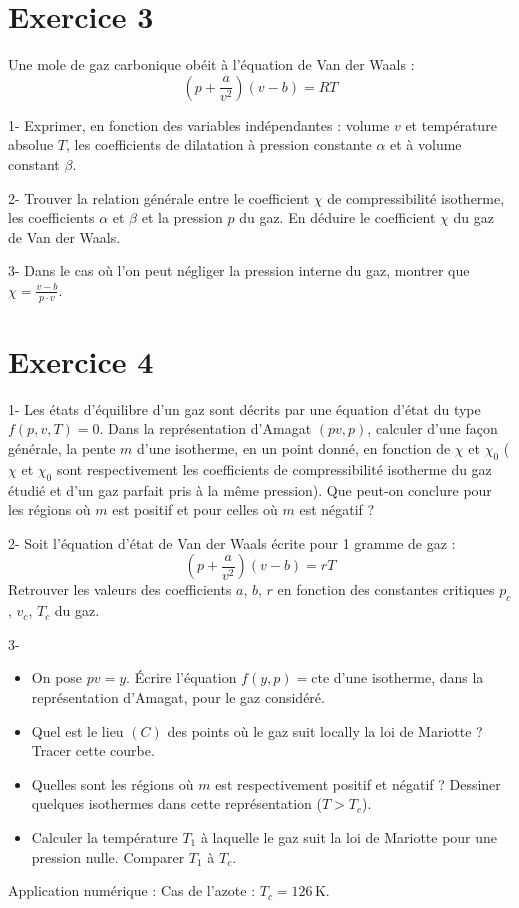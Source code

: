 \documentclass[a4paper,12pt]{article}
\begin{document}
	\section*{Exercice 3}
	Une mole de gaz carbonique obéit à l'équation de Van der Waals :
	\begin{equation}
		\left(p + \frac{a}{v^2}\right)(v-b) = RT
	\end{equation}
	
	1- Exprimer, en fonction des variables indépendantes : volume $v$ et température absolue $T$, les coefficients de dilatation à pression constante $\alpha$ et à volume constant $\beta$.
	
	2- Trouver la relation générale entre le coefficient $\chi$ de compressibilité isotherme, les coefficients $\alpha$ et $\beta$ et la pression $p$ du gaz. En déduire le coefficient $\chi$ du gaz de Van der Waals.
	
	3- Dans le cas où l'on peut négliger la pression interne du gaz, montrer que $\chi = \frac{v-b}{p \cdot v}$.
	
	\section*{Exercice 4}
	1- Les états d'équilibre d'un gaz sont décrits par une équation d'état du type $f(p,v,T) = 0$. Dans la représentation d'Amagat $(pv, p)$, calculer d'une façon générale, la pente $m$ d'une isotherme, en un point donné, en fonction de $\chi$ et $\chi_0$ ($\chi$ et $\chi_0$ sont respectivement les coefficients de compressibilité isotherme du gaz étudié et d'un gaz parfait pris à la même pression). Que peut-on conclure pour les régions où $m$ est positif et pour celles où $m$ est négatif ?
	
	2- Soit l'équation d'état de Van der Waals écrite pour 1 gramme de gaz :
	\begin{equation}
		\left(p + \frac{a}{v^2}\right)(v-b) = rT
	\end{equation}
	Retrouver les valeurs des coefficients $a$, $b$, $r$ en fonction des constantes critiques $p_c$, $v_c$, $T_c$ du gaz.
	
	3- 
	\begin{itemize}
		\item[a)] On pose $pv = y$. Écrire l'équation $f(y,p) = \text{cte}$ d'une isotherme, dans la représentation d'Amagat, pour le gaz considéré.
		\item[b)] Quel est le lieu $(C)$ des points où le gaz suit locally la loi de Mariotte ? Tracer cette courbe.
		\item[c)] Quelles sont les régions où $m$ est respectivement positif et négatif ? Dessiner quelques isothermes dans cette représentation ($T > T_c$).
		\item[d)] Calculer la température $T_1$ à laquelle le gaz suit la loi de Mariotte pour une pression nulle. Comparer $T_1$ à $T_c$.
	\end{itemize}
	Application numérique : Cas de l'azote : $T_c = 126\,\text{K}$.
	
\end{document}

